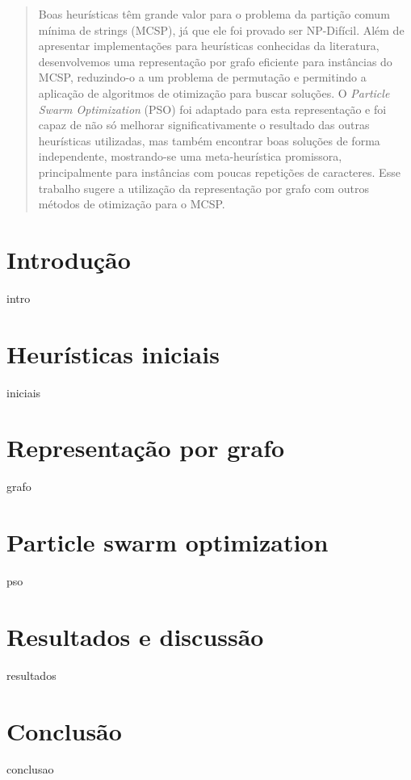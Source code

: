 \documentclass[11pt,twoside]{article}
\begin{document}

    \begin{abstract}
        Boas heurísticas têm grande valor para o problema da partição comum mínima de strings (MCSP), já que ele foi provado ser NP-Difícil. Além de apresentar implementações para heurísticas conhecidas da literatura, desenvolvemos uma representação por grafo eficiente para instâncias do MCSP, reduzindo-o a um problema de permutação e permitindo a aplicação de algoritmos de otimização para buscar soluções. O \textit{Particle Swarm Optimization} (PSO) foi adaptado para esta representação e foi capaz de não só melhorar significativamente o resultado das outras heurísticas utilizadas, mas também encontrar boas soluções de forma independente, mostrando-se uma meta-heurística promissora, principalmente para instâncias com poucas repetições de caracteres. Esse trabalho sugere a utilização da representação por grafo com outros métodos de otimização para o MCSP.
    \end{abstract}


    \section{Introdução}
        {intro}

    \section{Heurísticas iniciais}
        {iniciais}

    \section{Representação por grafo}
        {grafo}

    \section{Particle swarm optimization}
        {pso}

    \section{Resultados e discussão}
        {resultados}

    \section{Conclusão}
        {conclusao}

    \printbibliography
\end{document}
